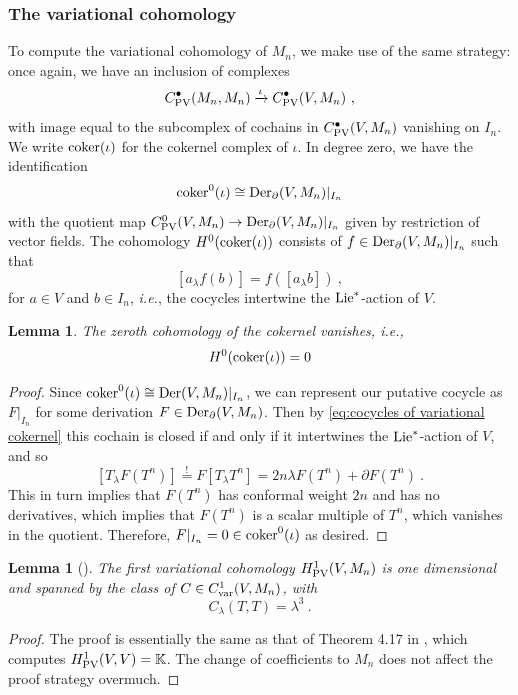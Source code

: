 \documentclass[11pt]{amsart}
\numberwithin{equation}{section}
\newtheorem{lemma}[theo]{Lemma}
\theoremstyle{definition}
\newcommand{\bb}{\mathbb}
\DeclareMathOperator{\Hom}{Hom}
\newcommand{\ik}{{\bb K}}
\newcommand{\coker}{{\textup{coker}}}
\newcommand{\Der}{{\textup{Der}}}
\newcommand{\Lie}{{\textup{Lie}}}
\newcommand{\PV}{{{\textup{PV}}}}
\newcommand{\0}{{\textbf{0}}}
\def \ie{{\it i.e.}}
\begin{document}
\subsubsection{The variational cohomology}

To compute the variational cohomology of $M_n$, we make use of the same strategy: once again, we have an inclusion of complexes 
\[
C^\bullet_{\rm PV}(M_n,M_n) \xrightarrow{\iota} C^\bullet_{\rm PV}(V,M_n)~,
\]
with image equal to the subcomplex of cochains in $C^\bullet_{\rm PV}(V,M_n)$ vanishing on $I_n$. We write $\coker(\iota)$ for the cokernel complex of $\iota$. 
In degree zero, we have the identification
\[
\coker^0(\iota) \cong \Der_{\partial}(V,M_n)|_{I_n}
\]
with the quotient map $C^0_{\rm PV}(V,M_n)\rightarrow \Der_{\partial}(V,M_n)|_{I_n}$ given by restriction of vector fields. The cohomology $H^0(\coker(\iota))$ consists of $f\in\Der_{\partial}(V,M_n)|_{I_n}$ such that 
\begin{equation}\label{eq:cocycles of variational cokernel}
[a_\lambda f(b)] = f([a_\lambda b])~,
\end{equation}
for $a\in V$ and $b\in I_n$, \ie, the cocycles intertwine the $\Lie^*$-action of $V$.




\begin{lemma}\label{lem: Ham vect fields of ideal}
	The zeroth cohomology of the cokernel vanishes, \ie,
	\[
	 H^0(\coker(\iota)) =0
	\]
\end{lemma}
\begin{proof}
 Since $\coker^0(\iota)\cong \Der(V,M_n)|_{I_n}$, we can represent our putative cocycle as $F|_{I_n}$ for some derivation $F\in \Der_{\partial}(V,M_n)$. Then by \eqref{eq:cocycles of variational cokernel} this cochain is closed if and only if it intertwines the $\Lie^*$-action of $V$, and so
 \[
 [T_\lambda F(T^n)] \overset{!}{=} F[T_\lambda T^n]= 2n \lambda F(T^n) + \partial F(T^n) ~.
 \]
 This in turn implies that $F(T^n)$ has conformal weight $2n$ and has no derivatives, which implies that $F(T^n)$ is a scalar multiple of $T^n$, which vanishes in the quotient. Therefore, $F|_{I_n} =0\in \coker^0(\iota) $ as desired.
\end{proof}



\begin{lemma}[\cite{Bakalov:2020computation}]\label{lem:Virasoro variational is 1d}
	The first variational cohomology $H^1_{\rm PV}(V,M_n)$ is one dimensional and spanned by the class of $C\in C^1_{\rm var}(V,M_n)$, with
	\[
	C_\lambda(T,T) = \lambda^3~.
	\]
\end{lemma}
\begin{proof}
	The proof is essentially the same as that of Theorem 4.17 in \cite{Bakalov:2020computation}, which computes $H^1_{\PV}(V,V)=\ik$. The change of coefficients to $M_n$ does not affect the proof strategy overmuch.
\end{proof}
\end{document}

